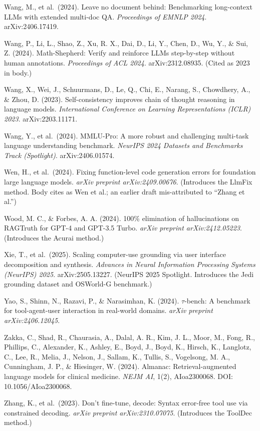\documentclass[
]{article}
\begin{document}
Wang, M., et al.~(2024). Leave no document behind: Benchmarking
long-context LLMs with extended multi-doc QA. \emph{Proceedings of EMNLP
2024}. arXiv:2406.17419.

Wang, P., Li, L., Shao, Z., Xu, R. X., Dai, D., Li, Y., Chen, D., Wu,
Y., \& Sui, Z. (2024). Math-Shepherd: Verify and reinforce LLMs
step-by-step without human annotations. \emph{Proceedings of ACL 2024}.
arXiv:2312.08935. (Cited as 2023 in body.)

Wang, X., Wei, J., Schuurmans, D., Le, Q., Chi, E., Narang, S.,
Chowdhery, A., \& Zhou, D. (2023). Self-consistency improves chain of
thought reasoning in language models. \emph{International Conference on
Learning Representations (ICLR) 2023}. arXiv:2203.11171.

Wang, Y., et al.~(2024). MMLU-Pro: A more robust and challenging
multi-task language understanding benchmark. \emph{NeurIPS 2024 Datasets
and Benchmarks Track (Spotlight)}. arXiv:2406.01574.

Wen, H., et al.~(2024). Fixing function-level code generation errors for
foundation large language models. \emph{arXiv preprint
arXiv:2409.00676}. (Introduces the LlmFix method. Body cites as Wen et
al.; an earlier draft mis-attributed to ``Zhang et al.'')

Wood, M. C., \& Forbes, A. A. (2024). 100\% elimination of
hallucinations on RAGTruth for GPT-4 and GPT-3.5 Turbo. \emph{arXiv
preprint arXiv:2412.05223}. (Introduces the Acurai method.)

Xie, T., et al.~(2025). Scaling computer-use grounding via user
interface decomposition and synthesis. \emph{Advances in Neural
Information Processing Systems (NeurIPS) 2025}. arXiv:2505.13227.
(NeurIPS 2025 Spotlight. Introduces the Jedi grounding dataset and
OSWorld-G benchmark.)

Yao, S., Shinn, N., Razavi, P., \& Narasimhan, K. (2024).
\(\tau\)-bench: A benchmark for tool-agent-user interaction in
real-world domains. \emph{arXiv preprint arXiv:2406.12045}.

Zakka, C., Shad, R., Chaurasia, A., Dalal, A. R., Kim, J. L., Moor, M.,
Fong, R., Phillips, C., Alexander, K., Ashley, E., Boyd, J., Boyd, K.,
Hirsch, K., Langlotz, C., Lee, R., Melia, J., Nelson, J., Sallam, K.,
Tullis, S., Vogelsong, M. A., Cunningham, J. P., \& Hiesinger, W.
(2024). Almanac: Retrieval-augmented language models for clinical
medicine. \emph{NEJM AI}, 1(2), AIoa2300068. DOI: 10.1056/AIoa2300068.

Zhang, K., et al.~(2023). Don't fine-tune, decode: Syntax error-free
tool use via constrained decoding. \emph{arXiv preprint
arXiv:2310.07075}. (Introduces the ToolDec method.)
\end{document}

